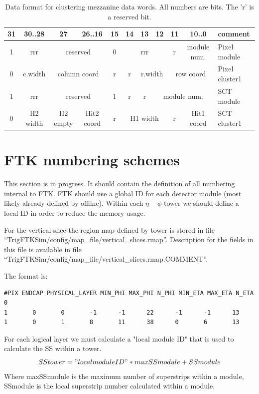 \documentclass[10pt]{article}
\numberwithin{figure}{section}
\numberwithin{equation}{section}
\numberwithin{table}{section}
\newcommand{\0}{\phantom{0}}
\begin{document}
\begin{table}[h]
\begin{tabular}{c|c|c|c|c|c|c|c|c|c|l}
  31 & 30..28 & 27 & 26..16 & 15 & 14 & 13 & 12 & 11 & 10..0 & comment\\ \hline
  1 & rrr & \multicolumn{2}{c|}{reserved} & 0 & \multicolumn{3}{c|}{rrr} & r & module num. & Pixel module\\\hline

  0 & c.width & \multicolumn{2}{c|}{column coord} &
  r & r & \multicolumn{2}{c|}{r.width} & \multicolumn{2}{c|}{row coord} & Pixel cluster1\\\hline
  1 & rrr & \multicolumn{2}{c|}{reserved} & 
  1 & r & r &\multicolumn{3}{c|}{module num.} & SCT module\\\hline

  0 & H2 width &
  H2 empty & Hit2 coord &
  r & \multicolumn{3}{c|}{H1 width} & r & Hit1 coord & SCT cluster1\\\hline

\end{tabular}
\caption{\label{tab:FTK_IMdataWords} Data format for clustering mezzanine data words. All numbers are bits. The 'r' is a reserved bit.}
\end{table}

\newpage
\section{FTK numbering schemes}

This section is in progress. It should contain the definition of all numbering internal to FTK.
FTK should use a global ID for each detector module (most likely already defined by offline).
Within each $\eta-\phi$ tower we should define a local ID in order to reduce the memory usage.

For the vertical slice the region map defined by tower is stored in file ``TrigFTKSim/config/map\_file/vertical\_slices.rmap''. Description for the fields in this file is available in file ``TrigFTKSim/config/map\_file/vertical\_slices.rmap.COMMENT''.

The format is: 
\begin{verbatim}
#PIX ENDCAP PHYSICAL_LAYER MIN_PHI MAX_PHI N_PHI MIN_ETA MAX_ETA N_ETA 
0
1       0       0       -1      -1      22      -1      -1      13
1       0       1       8       11      38      0       6       13
\end{verbatim}

For each logical layer we must calculate a "local module ID" that is used to calculate the SS within a tower.
\[ SStower = "local module ID" * maxSSmodule + SSmodule \]
Where maxSSmodule is the maximum number of superstrips within a module,
SSmodule is the local superstrip number calculated within a module.
\end{document}
